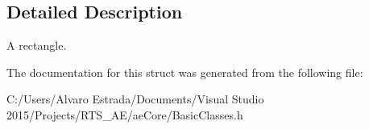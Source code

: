 \subsection{Detailed Description}
A rectangle. 

The documentation for this struct was generated from the following file\+:\begin{DoxyCompactItemize}
\item 
C\+:/\+Users/\+Alvaro Estrada/\+Documents/\+Visual Studio 2015/\+Projects/\+R\+T\+S\+\_\+\+A\+E/ae\+Core/Basic\+Classes.\+h\end{DoxyCompactItemize}
